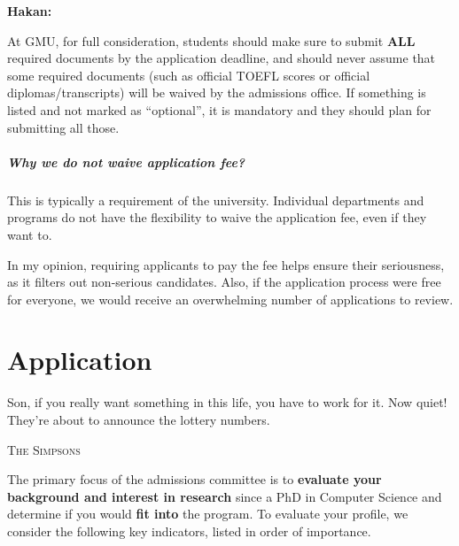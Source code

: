 \documentclass[oneside,11pt]{memoir}
\newenvironment{commentbox}[1][]{
\small
    \begin{mybox}
    {\small \textbf{#1}}
 }{
   \end{mybox}
}
\newcommand{\mycomment}[3][\color{blue}]{{#1{{#2}: {#3}}}}
\newcommand{\didi}[1]{\mycomment{Didier}{#1}}{}
\begin{document}

\begin{commentbox}[Hakan:]
At GMU, for full consideration, students should make sure to submit \textbf{ALL} required documents by the application deadline, and should never assume that some required documents (such as official TOEFL scores or official diplomas/transcripts) will be waived by the admissions office. If something is listed and not marked as ``optional'', it is mandatory and they should plan for submitting all those.  
\end{commentbox}
\paragraph{Why we do not waive application fee?}  This is typically a requirement of the university. Individual departments and programs do not have the flexibility to waive the application fee, even if they want to. 

In my opinion, requiring applicants to pay the fee helps ensure their seriousness, as it filters out non-serious candidates. Also, if the application process were free for everyone, we would receive an overwhelming number of applications to review.




\chapter{Application}\label{sec:application}

\epigraph{Son, if you really want something in this life, you have to work for it. Now quiet! They’re about to announce the lottery numbers.}{\textsc{The Simpsons}}


The primary focus of the admissions committee is to \textbf{evaluate your background and interest in research} since a PhD in Computer Science and determine if you would \textbf{fit into} the program. To evaluate your profile, we consider
the following key indicators, listed in order of importance.
\end{document}

